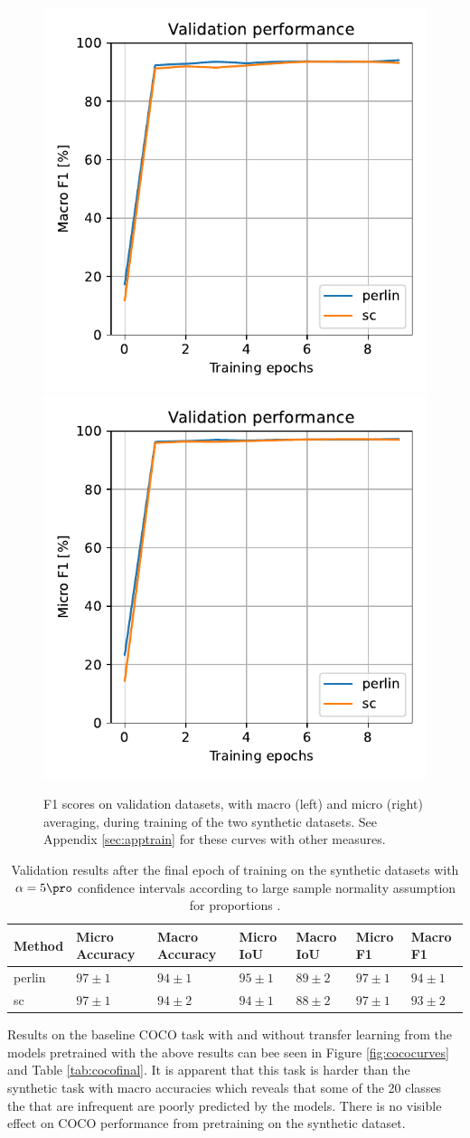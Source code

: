 \documentclass[12pt,fleqn]{article}
\begin{document}
\begin{figure}[H]
    \centering
        \includegraphics[width=.49\linewidth]{fb/Macro F1}
        \includegraphics[width=.49\linewidth]{fb/Micro F1}
    \caption{
        F1 scores on validation datasets, with macro (left) and micro (right) averaging, during training of the two synthetic datasets. See Appendix \ref{sec:apptrain} for these curves with other measures.
    }
    \label{fig:fbcurves}
\end{figure}\noindent


\begin{table}[H]
    \small
    \centering
    \begin{tabular}{l|llllll}
            Method & Micro Accuracy & Macro Accuracy & Micro IoU & Macro IoU & Micro F1 & Macro F1 \\
            \hline
            perlin & $97 \pm 1$ & $94 \pm 1$ & $95 \pm 1$ & $89 \pm 2$ & $97 \pm 1$ & $94 \pm 1$ \\
            sc & $97 \pm 1$ & $94 \pm 2$ & $94 \pm 1$ & $88 \pm 2$ & $97 \pm 1$ & $93 \pm 2$
    \end{tabular}
    \caption{
        Validation results after the final epoch of training on the synthetic datasets with $\alpha=5\pro$ confidence intervals according to large sample normality assumption for proportions \cite[Method 7.3]{brock2015intro}.
    }
    \label{tab:fbfinal}
\end{table}\noindent
Results on the baseline COCO task with and without transfer learning from the models pretrained with the above results can bee seen in Figure \ref{fig:cococurves} and Table \ref{tab:cocofinal}.
It is apparent that this task is harder than the synthetic task with macro accuracies which reveals that some of the 20 classes the that are infrequent are poorly predicted by the models.
There is no visible effect on COCO performance from pretraining on the synthetic dataset.
\end{document}

